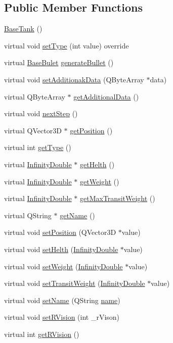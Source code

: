 \subsection*{Public Member Functions}
\begin{DoxyCompactItemize}
\item 
\hyperlink{a00157_ab09f29abaec12417480cae3a5f900a41}{Base\+Tank} ()
\item 
virtual void \hyperlink{a00157_a455ad8853248e1976e9d817eb55f102a}{set\+Type} (int value) override
\item 
virtual \hyperlink{a00153}{Base\+Bulet} \hyperlink{a00157_a901c01a2908f900b4cd45e791d27b0d3}{generate\+Bullet} ()
\item 
virtual void \hyperlink{a00157_a7e61943b1d601b7ff3206857f5198e66}{set\+Additionak\+Data} (Q\+Byte\+Array $\ast$data)
\item 
virtual Q\+Byte\+Array $\ast$ \hyperlink{a00157_aeecdd72e10d3996ee6c72c59f8bf69d8}{get\+Additional\+Data} ()
\item 
virtual void \hyperlink{a00137_ae2be75da1a2a9edfabe993770e24654a}{next\+Step} ()
\item 
virtual Q\+Vector3D $\ast$ \hyperlink{a00137_a3159c02c1118989e3476b52d89a52401}{get\+Position} ()
\item 
virtual int \hyperlink{a00137_a639bd1e233821ff606bb8fe2931f6ee7}{get\+Type} ()
\item 
virtual \hyperlink{a00161}{Infinity\+Double} $\ast$ \hyperlink{a00137_a13a00e39ece3e20e3f5e049224da8d40}{get\+Helth} ()
\item 
virtual \hyperlink{a00161}{Infinity\+Double} $\ast$ \hyperlink{a00137_a935a07134430bbb44c3214629d607a3d}{get\+Weight} ()
\item 
virtual \hyperlink{a00161}{Infinity\+Double} $\ast$ \hyperlink{a00137_a4c74c903e19ada9da9150cf9569b4e9d}{get\+Max\+Transit\+Weight} ()
\item 
virtual Q\+String $\ast$ \hyperlink{a00137_a01051b9a502128a82f9a168a14d1ecdc}{get\+Name} ()
\item 
virtual void \hyperlink{a00137_a54dc1a743fac99db03c3f47b5c6d69c4}{set\+Position} (Q\+Vector3D $\ast$value)
\item 
virtual void \hyperlink{a00137_a2f95e7a61b5db7f2fbbfd32ff786f58c}{set\+Helth} (\hyperlink{a00161}{Infinity\+Double} $\ast$value)
\item 
virtual void \hyperlink{a00137_a4b5e42aa7985c9bf959f0275cbc1bac7}{set\+Weight} (\hyperlink{a00161}{Infinity\+Double} $\ast$value)
\item 
virtual void \hyperlink{a00137_ac480b8140b5b290f49b4b96a47291180}{set\+Transit\+Weight} (\hyperlink{a00161}{Infinity\+Double} $\ast$value)
\item 
virtual void \hyperlink{a00137_a874f246d3249a989750e3db85ea4bfcd}{set\+Name} (Q\+String \hyperlink{a00137_af35fba4ed599605c3d78b3c3a71fa467}{name})
\item 
virtual void \hyperlink{a00137_a2719e14051c30f39ca60f4998e48abf9}{set\+R\+Vision} (int \+\_\+r\+Vison)
\item 
virtual int \hyperlink{a00137_a4437ee7dcdb6e3e3c58c8b00d8bb0500}{get\+R\+Vision} ()
\end{DoxyCompactItemize}
